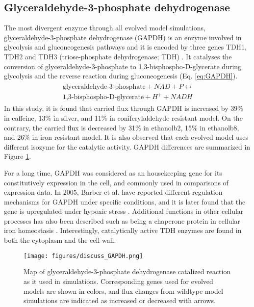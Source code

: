 \subsection{Glyceraldehyde-3-phosphate dehydrogenase}
The most divergent enzyme through all evolved model simulations, glyceraldehyde-3-phosphate dehydrogenase (GAPDH) is an enzyme involved in glycolysis and gluconeogenesis pathways and it is encoded by three genes TDH1, TDH2 and TDH3 (triose-phosphate dehydrogenase; TDH) \cite{boucherie1995differential}. It catalyses the conversion of glyceraldehyde-3-phosphate to 1,3-bisphospho-D-glycerate during glycolysis and the reverse reaction during gluconeogenesis (Eq. \ref{eq:GAPDH}).
\begin{align}
\label{eq:GAPDH}
\begin{split}
\ \text{glyceraldehyde-3-phosphate} + NAD + P \leftrightarrow \\
\ \text{1,3-bisphospho-D-glycerate} + H^+ + NADH
\end{split}
\end{align}
In this study, it is found that carried flux through GAPDH is increased by 39\% in caffeine, 13\% in silver, and 11\% in coniferylaldehyde resistant model. On the contrary, the carried flux is decreased by 31\% in ethanolb2, 15\% in ethanolb8, and 26\% in iron resistant model. It is also observed that each evolved model uses different isozyme for the catalytic activity. GAPDH differences are summarized in Figure \ref{fig:discuss_GAPDH}.

For a long time, GAPDH was considered as an housekeeping gene for its constitutively expression in the cell, and commonly used in comparisons of expression data. In 2005, Barber et al. have reported different regulation mechanisms for GAPDH under specific conditions\cite{barber2005gapdh}, and it is later found that the gene is upregulated under hypoxic stress \cite{yang2008effects}. Additional functions in other cellular processes has also been described such as being a chaperone protein in cellular iron homeostasis \cite{sweeny2018glyceraldehyde}. Interestingly, catalytically active TDH enzymes are found in both the cytoplasm and the cell wall.

\begin{figure}[H]
\texttt{[image: figures/discuss\_GAPDH.png]}
\caption[Map of glyceraldehyde-3-phosphate dehydrogenase catalized reaction as it used in simulations]{Map of glyceraldehyde-3-phosphate dehydrogenase catalized reaction as it used in simulations. Corresponding genes used for evolved models are shown in colors, and flux changes from wildtype model simulations are indicated as increased or decreased with arrows.}
\label{fig:discuss_GAPDH}
\end{figure}

